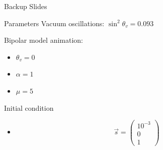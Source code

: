 
\begin{frame}

\begin{tcolorbox}
   \centering
   Backup Slides
\end{tcolorbox}

\end{frame}

\begin{frame}{Parameters}
Vacuum oscillations:
   $\sin^2\theta_v = 0.093$

Bipolar model animation:
\begin{itemize}
   \item $\theta_v = 0$
   \item $\alpha = 1$
   \item $\mu = 5$
\end{itemize}
Initial condition
\begin{itemize}
   \item \begin{equation*}
   \vec s = \begin{pmatrix}
      10^{-3} \\
      0 \\
      1
   \end{pmatrix}
   \end{equation*}
\end{itemize}

\end{frame}





